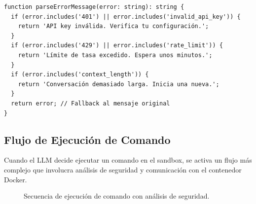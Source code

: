 \begin{verbatim}
function parseErrorMessage(error: string): string {
  if (error.includes('401') || error.includes('invalid_api_key')) {
    return 'API key inválida. Verifica tu configuración.';
  }
  if (error.includes('429') || error.includes('rate_limit')) {
    return 'Límite de tasa excedido. Espera unos minutos.';
  }
  if (error.includes('context_length')) {
    return 'Conversación demasiado larga. Inicia una nueva.';
  }
  return error; // Fallback al mensaje original
}
\end{verbatim}

\subsection{Flujo de Ejecución de Comando}

Cuando el LLM decide ejecutar un comando en el sandbox, se activa un flujo más complejo que involucra análisis de seguridad y comunicación con el contenedor Docker.

\begin{figure}[H]
    \centering
    \caption{Secuencia de ejecución de comando con análisis de seguridad.}
    \label{fig:command_flow}
\end{figure}

